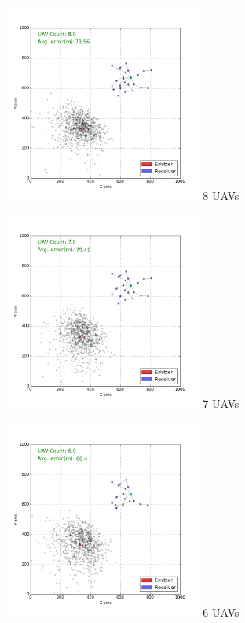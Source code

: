 \documentclass[10pt,a4paper]{book}
\begin{document}
\begin{figure}[H]
\centering
\begin{minipage}{60mm}
  \centering
\includegraphics[width=65mm]{3_steps/Generation_1000/Pareto_0.png}
  8 \glspl{UAV}
\end{minipage}%
\begin{minipage}{60mm}
  \centering
\includegraphics[width=65mm]{3_steps/Generation_1000/Pareto_1.png}
  7 \glspl{UAV}
\end{minipage}
\begin{minipage}{60mm}
  \centering
\includegraphics[width=65mm]{3_steps/Generation_1000/Pareto_2.png}
  6 \glspl{UAV}
\end{minipage}

\end{figure}
\end{document}
